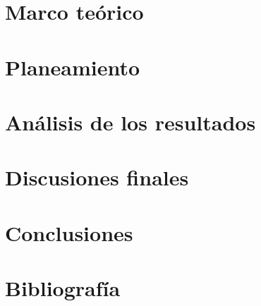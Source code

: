 \documentclass[letterpaper]{article}
\begin{document}
		
	
\section{Marco teórico}


\section{Planeamiento}

\section{Análisis de los resultados}

\section{Discusiones finales}

\section{Conclusiones}







		\newpage
	\section{Bibliografía}
		
		
		\nocite{*}
\end{document}
